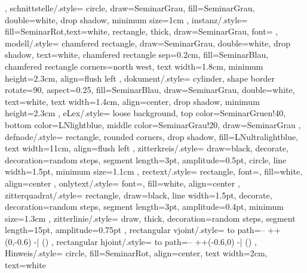 {{    },
    schnittstelle/.style={
        circle, draw=SeminarGrau, fill=SeminarGrau, double=white, drop shadow, minimum size=1cm
    },
    instanz/.style={
        fill=SeminarRot,text=white, rectangle, thick, draw=SeminarGrau, font=\footnotesize
    },
    modell/.style={
        chamfered rectangle, draw=SeminarGrau, double=white, drop shadow, text=white, chamfered rectangle sep=0.2cm, fill=SeminarBlau, chamfered rectangle corners=north west, text width=1.8cm, minimum height=2.3cm, align=flush left
    },
    dokument/.style={
        cylinder, shape border rotate=90, aspect=0.25, fill=SeminarBlau, draw=SeminarGrau, double=white, text=white, text width=1.4cm, align=center, drop shadow, minimum height=2.3cm
    },
    eLex/.style={
        loose background, top color=SeminarGruen!40, bottom color=LNlightblue, middle color=SeminarGrau!20,  draw=SeminarGrau
    },
    defnode/.style={
        rectangle, rounded corners, drop shadow, fill=LNultralightblue, text width=11cm, align=flush left
    },
    zitterkreis/.style={
        draw=black, decorate, decoration={random steps, segment length=3pt, amplitude=0.5pt}, circle, line width=1.5pt, minimum size=1.1cm
    },
    rectext/.style={
        rectangle, font=\TTBOLD, fill=white, align=center
    },
    onlytext/.style={
        font=\TTBOLD, fill=white, align=center
    },
    zitterquadrat/.style={
        rectangle, draw=black, line width=1.5pt, decorate, decoration={random steps, segment length=3pt, amplitude=0.4pt}, minimum size=1.3cm
    },
    zitterlinie/.style={
        draw, thick, decoration={random steps, segment length=15pt, amplitude=0.75pt}
    },
    rectangular vjoint/.style={
        to path={-- ++(0,-0.6) -| (\tikztotarget)}
    },
    rectangular hjoint/.style={
        to path={-- ++(-0.6,0) -| (\tikztotarget)}
    },
    Hinweis/.style={
        circle, fill=SeminarRot, align=center, text width=2cm, text=white
    }
}

\RequirePackage{pgfplots}
